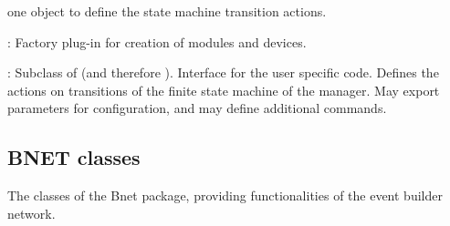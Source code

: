 \begin{compactdesc}
\begin{compactenum}
      one  object to define the state machine transition actions.
\end{compactenum}
\item[\class{dabc::Factory}] : Factory plug-in for creation of modules and devices.
\item[\class{dabc::Application}] : Subclass of  
   (and therefore ). Interface for the user specific code. 
   Defines the actions on transitions of the finite state machine of the manager. 
   May export parameters for configuration, and may define additional commands.
\end{compactdesc}

\subsection{BNET classes}
\label{prog_bnet_classes}
The classes of the Bnet package, providing functionalities of the event builder network.

